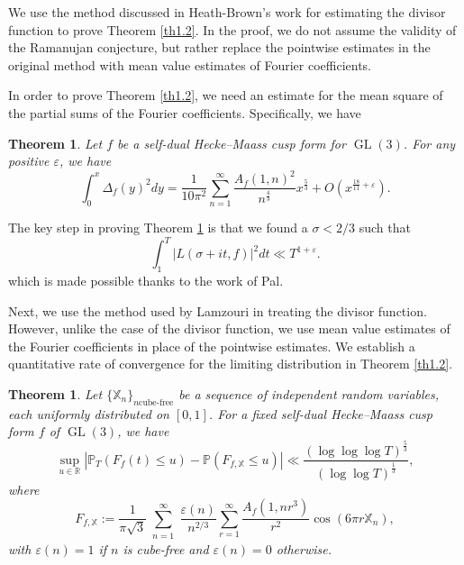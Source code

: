 \documentclass[10pt,leqno]{amsart}
\numberwithin{equation}{section}
\newtheorem{theorem}[definition]{{Theorem}}
\begin{document}
We use the method discussed in Heath-Brown’s work \cite{MR1159354} for estimating the divisor function to prove Theorem \ref{th1.2}. 
In the proof, we do not assume the validity of the Ramanujan conjecture, but rather replace the pointwise estimates in the original method with mean value estimates of Fourier coefficients.

In order to prove  Theorem \ref{th1.2}, we need an estimate for the mean square of the partial sums of the Fourier coefficients. Specifically, we have 
\begin{theorem}\label{th1.3}
   Let $f$ be a self-dual Hecke--Maass cusp form for $\operatorname{GL}(3)$. For any positive $\varepsilon$, we have
    \[
    \int_{0}^{x}\Delta_f\left(y\right)^2dy=\frac{1}{10\pi^2}\sum_{n=1}^\infty\frac{A_f\left(1,n\right)^2}{n^{\frac{4}{3}}}x^{\frac{5}{3}}+O\left(x^{\frac{18}{11}+\varepsilon}\right).
    \]
\end{theorem}
The key step in proving Theorem \ref{th1.3} is that we found a $\sigma<2/3$ such that
\[
\int_{1}^T \left|L(\sigma+it,f)\right|^2dt\ll T^{1+\varepsilon}.
\]
which is made possible thanks to the work \cite{MR4945119} of Pal.


Next, we use the method used by Lamzouri \cite{MR4041109} in treating the divisor function. However, unlike the case of the divisor function, we use mean value estimates of the Fourier coefficients in place of the pointwise estimates. We establish a quantitative  rate of convergence for the limiting distribution in Theorem \ref{th1.2}.
\begin{theorem}\label{th1.4} 
   Let $\{\mathbb{X}_n\}_{n \text{cube-free}}$ be a sequence of independent random variables, each uniformly distributed on \([0,1]\).  For a fixed self-dual Hecke--Maass cusp form $f$ of $\operatorname{GL}(3)$, we have
    \[
\sup_{u \in \mathbb{R}} \left| \mathbb{P}_T(F_f(t) \leqslant u) - \mathbb{P}(F_{f,\mathbb{X}} \leqslant u) \right|\ll \frac{\left(\log\log\log   T\right)^\frac{5}{3}}{\left(\log\log  T\right)^{\frac{1}{3}}},
\]
where \begin{equation}\label{eq1.5}
F_{f,\mathbb{X}} := \frac{1}{\pi \sqrt{3}} \sum_{\substack{n=1}}^{\infty} \frac{\varepsilon(n)}{n^{2/3}} \sum_{r=1}^{\infty} \frac{A_f(1,n r^3)}{r^{2}} \cos\left(6\pi r \mathbb{X}_n\right),
\end{equation}
with  $\varepsilon(n)=1$ if $n$ is cube-free and $\varepsilon(n)=0$ otherwise.
\end{theorem}
\end{document}
